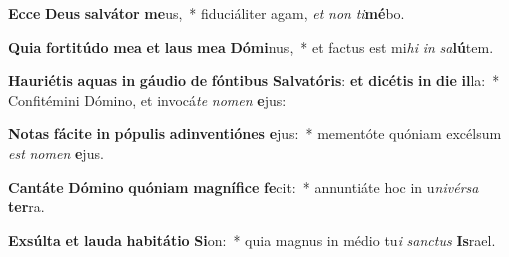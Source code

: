 \item \textbf{Ec}\textbf{ce} \textbf{De}\textbf{us} \textbf{sal}\textbf{vá}\textbf{tor} \textbf{me}us,~* fiduciáliter agam, \textit{et} \textit{non} \textit{ti}\textbf{mé}bo.
\item \textbf{Qui}\textbf{a} \textbf{for}\textbf{ti}\textbf{tú}\textbf{do} \textbf{me}\textbf{a} \textbf{et} \textbf{laus} \textbf{me}\textbf{a} \textbf{Dó}\textbf{mi}nus,~* et factus est mi\textit{hi} \textit{in} \textit{sa}\textbf{lú}tem.
\item \textbf{Hau}\textbf{ri}\textbf{é}\textbf{tis} \textbf{a}\textbf{quas} \textbf{in} \textbf{gáu}\textbf{di}\textbf{o} \textbf{de} \textbf{fón}\textbf{ti}\textbf{bus} \textbf{Sal}\textbf{va}\textbf{tó}\textbf{ris}: \textbf{et} \textbf{di}\textbf{cé}\textbf{tis} \textbf{in} \textbf{di}\textbf{e} \textbf{il}la:~* Confitémini Dómino, et invocá\textit{te} \textit{no}\textit{men} \textbf{e}jus:
\item \textbf{No}\textbf{tas} \textbf{fá}\textbf{ci}\textbf{te} \textbf{in} \textbf{pó}\textbf{pu}\textbf{lis} \textbf{ad}\textbf{in}\textbf{ven}\textbf{ti}\textbf{ó}\textbf{nes} \textbf{e}jus:~* mementóte quóniam excélsum \textit{est} \textit{no}\textit{men} \textbf{e}jus.
\item \textbf{Can}\textbf{tá}\textbf{te} \textbf{Dó}\textbf{mi}\textbf{no} \textbf{quón}\textbf{i}\textbf{am} \textbf{ma}\textbf{gní}\textbf{fi}\textbf{ce} \textbf{fe}cit:~* annuntiáte hoc in u\textit{ni}\textit{vér}\textit{sa} \textbf{ter}ra.
\item \textbf{Ex}\textbf{súl}\textbf{ta} \textbf{et} \textbf{lau}\textbf{da} \textbf{ha}\textbf{bi}\textbf{tá}\textbf{ti}\textbf{o} \textbf{Si}on:~* quia magnus in médio tu\textit{i} \textit{sanc}\textit{tus} \textbf{Is}rael.
